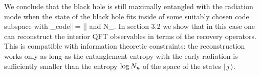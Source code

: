 \documentclass[12pt]{article}%
\def\spc{\hspace{.5pt}}
\begin{document}
We conclude  that the black hole is still maximally entangled with the radiation mode when the state of the black hole fits inside of some suitably chosen
code subspace with
\bea
\Pi_{\rm code}\bigl|\!\nspc\spc\bigl|\nom \,\bigr\rangle\!\!\bigr\rangle = %
\;\bigl|\!\nspc\spc\bigl|\nom \,\bigr\rangle\!\!\bigr\rangle\,\quad\mbox{and} \ll N_\nom.
\eea
In section 3.2 we show that in this case one can reconstruct the interior QFT observables in terms of the recovery operators. This is compatible
with information theoretic constraints: the reconstruction works only as long as the entanglement entropy with the early radiation is sufficiently 
smaller than the entropy $\log N_{ \textit{\textbf n}}$ of the space of the states $\bigl|\, j\, \bigr\rangle$.
\end{document}
